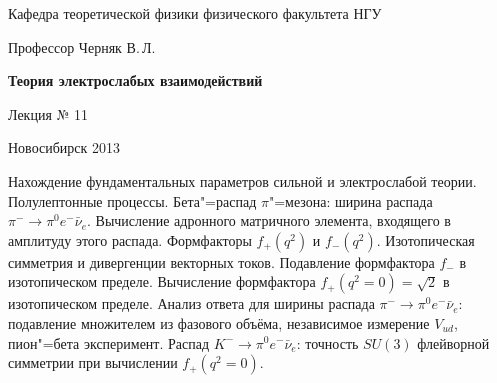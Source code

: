 \documentclass[12pt,pagesize,paper=landscape,paper=192mm:108mm]{scrbook}
\begin{document}
\begin{titlepage}
\begin{center}
    Кафедра теоретической физики физического факультета НГУ
    \medskip

    \Large
    Профессор Черняк В.\,Л.
    \bigskip

    \huge
    \textbf{Теория электрослабых взаимодействий}
    \bigskip

    \Large
    Лекция № 11
    \vfill

    \vfill

\normalsize    Новосибирск 2013
  \smallskip

  \ccbysa
  \end{center}
\end{titlepage}
\newpage

\vspace*{-1em}
\begin{center}
 \vfill
  \begin{minipage}{0.66\linewidth}
    Нахождение фундаментальных параметров сильной и электрослабой
    теории. Полулептонные процессы. Бета"=распад $\pi$"=мезона: ширина
    распада $\pi^-\to\pi^0 e^-\bar{\nu}_e$.  Вычисление адронного
    матричного элемента, входящего в амплитуду этого распада.
    Формфакторы $f_+(q^2)$ и $f_-(q^2)$.  Изотопическая симметрия и
    дивергенции векторных токов. Подавление формфактора $f_-$ в
    изотопическом пределе.  Вычисление формфактора
    $f_+(q^2=0)=\sqrt{2}$ в изотопическом пределе.  Анализ ответа для
    ширины распада $\pi^-\to\pi^0 e^-\bar{\nu}_e$: подавление
    множителем из фазового объёма, независимое измерение $V_{ud}$,
    пион"=бета эксперимент.  Распад $K^-\to\pi^0 e^-\bar{\nu}_e$:
    точность $SU(3)$ флейворной симметрии при вычислении $f_+(q^2=0)$.
  \end{minipage}
  \vfill

\end{center}
\end{document}
